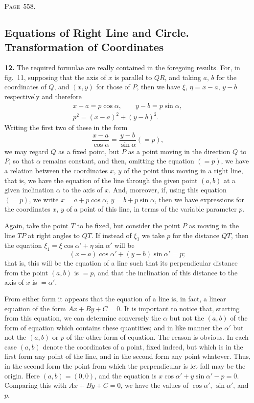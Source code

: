 \documentclass[11pt,a4paper]{book}
\begin{document}
\newpage
\noindent\textsc{Page~558.} \subsection*{Equations of Right Line and Circle. Transformation of Coordinates}

\textbf{12.} The required formulae are really contained in the foregoing results. For, in fig.~11, supposing that the axis of $x$ is parallel to $QR$, and taking $a$, $b$ for the coordinates of $Q$, and $(x,y)$ for those of $P$, then we have $\xi$, $\eta = x-a$, $y-b$ respectively and therefore
\begin{gather*}
x-a = p\cos\alpha,\qquad y-b = p\sin\alpha,\\
p^2 = (x-a)^2+(y-b)^2.
\end{gather*}
Writing the first two of these in the form
\[
\frac{x-a}{\cos\alpha} = \frac{y-b}{\sin\alpha} (= p),
\]
we may regard $Q$ as a fixed point, but $P$ as a point moving in the direction $Q$ to $P$, so that $\alpha$ remains constant, and then, omitting the equation $(=p)$, we have a relation between the coordinates $x$, $y$ of the point thus moving in a right line, that is, we have the equation of the line through the given point $(a,b)$ at a given inclination $\alpha$ to the axis of $x$. And, moreover, if, using this equation $(=p)$, we write $x=a+p\cos\alpha$, $y=b+p\sin\alpha$, then we have expressions for the coordinates $x$, $y$ of a point of this line, in terms of the variable parameter $p$.

Again, take the point $T$ to be fixed, but consider the point $P$ as moving in the line $TP$ at right angles to $QT$. If instead of $\xi_1$ we take $p$ for the distance $QT$, then the equation $\xi_1=\xi\cos\alpha'+\eta\sin\alpha'$ will be
\[
(x-a)\cos\alpha' + (y-b)\sin\alpha' = p;
\]
that is, this will be the equation of a line such that its perpendicular distance from the point $(a,b)$ is $=p$, and that the inclination of this distance to the axis of $x$ is $=\alpha'$.

From either form it appears that the equation of a line is, in fact, a linear equation of the form $Ax+By+C=0$. It is important to notice that, starting from this equation, we can determine conversely the $\alpha$ but not the $(a,b)$ of the form of equation which contains these quantities; and in like manner the $\alpha'$ but not the $(a,b)$ or $p$ of the other form of equation. The reason is obvious. In each case $(a,b)$ denote the coordinates of a point, fixed indeed, but which is in the first form any point of the line, and in the second form any point whatever. Thus, in the second form the point from which the perpendicular is let fall may be the origin. Here $(a,b)=(0,0)$, and the equation is $x\cos\alpha'+y\sin\alpha'-p=0$. Comparing this with $Ax+By+C=0$, we have the values of $\cos\alpha'$, $\sin\alpha'$, and $p$.
\end{document}
